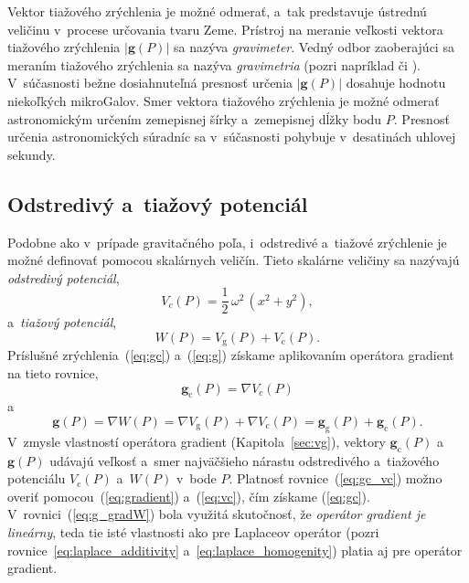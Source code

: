 \documentclass[a4paper, 12pt]{book}
\newcommand{\gidx}{\mathrm g}
\newcommand{\cidx}{\mathrm c}
\let\vec\mathbf
\begin{document}
Vektor tiažového zrýchlenia je možné odmerať, a~tak predstavuje ústrednú
veličinu v~procese určovania tvaru Zeme.  Prístroj na meranie veľkosti vektora
tiažového zrýchlenia $| \vec g(P) |$ sa nazýva \emph{gravimeter}.  Vedný odbor
zaoberajúci sa meraním tiažového zrýchlenia sa nazýva \emph{gravimetria} (pozri
napríklad \citealt{Torge1989,Rozimant1994} či \citealt{Janak2010}).
V~súčasnosti bežne dosiahnuteľná presnosť určenia $| \vec g(P) |$ dosahuje
hodnotu niekoľkých mikroGalov.  Smer vektora tiažového zrýchlenia je možné
odmerať astronomickým určením zemepisnej šírky a~zemepisnej dĺžky bodu $P$.
Presnosť určenia astronomických súradníc sa v~súčasnosti pohybuje v~desatinách
uhlovej sekundy.






\subsection{Odstredivý a~tiažový potenciál}

Podobne ako v~prípade gravitačného poľa, i~odstredivé a~tiažové zrýchlenie je
možné definovať pomocou skalárnych veličín.  Tieto skalárne veličiny sa
nazývajú \emph{odstredivý potenciál},
%
\begin{equation}
\label{eq:vc}
V_c(P) = \frac{1}{2} \, \omega^2 \, (x^2 + y^2){,}
\end{equation}
%
a~\emph{tiažový potenciál},
%
\begin{equation}
\label{eq:w}
W(P) = V_\gidx(P) + V_\cidx(P){.}
\end{equation}
%
Príslušné zrýchlenia~(\ref{eq:gc}) a~(\ref{eq:g}) získame aplikovaním operátora
gradient na tieto rovnice,
%
\begin{equation}
\label{eq:gc_vc}
\vec g_\cidx(P) = \nabla V_c(P)
\end{equation}
%
a
%
\begin{equation}
\label{eq:g_gradW}
\vec g(P) = \nabla W(P) = \nabla V_\gidx(P) + \nabla V_\cidx(P) = \vec
g_\gidx(P) + \vec g_\cidx(P){.}
\end{equation}
%
V~zmysle vlastností operátora gradient (Kapitola~\ref{sec:vg}), vektory $\vec
g_\cidx(P)$ a~$\vec g(P)$ udávajú veľkosť a~smer najväčšieho nárastu
odstredivého a~tiažového potenciálu $V_\cidx(P)$ a~$W(P)$ v~bode $P$.  Platnosť
rovnice~(\ref{eq:gc_vc}) možno overiť pomocou~(\ref{eq:gradient})
a~(\ref{eq:vc}), čím získame (\ref{eq:gc}).  V~rovnici~(\ref{eq:g_gradW}) bola
využitá skutočnosť, že \emph{operátor gradient je lineárny}, teda tie isté
vlastnosti ako pre Laplaceov operátor (pozri
rovnice~\ref{eq:laplace_additivity} a~\ref{eq:laplace_homogenity}) platia aj
pre operátor gradient.
\end{document}

